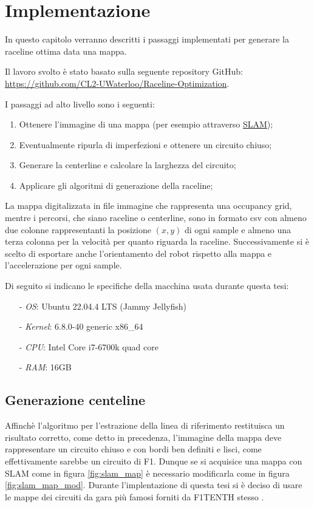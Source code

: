 
\chapter{Implementazione}
\label{chap:impl}
In questo capitolo verranno descritti i passaggi implementati per generare la raceline ottima data una
mappa.

Il lavoro svolto è stato basato sulla seguente repository GitHub:
\url{https://github.com/CL2-UWaterloo/Raceline-Optimization}.

\bigskip
\noindent I passaggi ad alto livello sono i seguenti:
\begin{enumerate}
	\item Ottenere l'immagine di una mappa (per esempio attraverso \hyperref[par:slam]{SLAM});
	\item Eventualmente ripurla di imperfezioni e ottenere un circuito chiuso; 
	\item Generare la centerline e calcolare la larghezza del circuito;
	\item Applicare gli algoritmi di generazione della raceline;
\end{enumerate}

La mappa digitalizzata in file immagine che rappresenta una occupancy grid, mentre
i percorsi, che siano raceline o centerline, sono in formato csv con almeno due colonne rappresentanti la
posizione $(x,y)$ di ogni sample e almeno una terza colonna per la velocità per quanto riguarda la
raceline. Successivamente si è scelto di esportare anche l'orientamento del robot rispetto alla mappa e
l'accelerazione per ogni sample.

\bigskip
\noindent Di seguito si indicano le specifiche della macchina usata durante questa tesi:
\begin{itemize}
	\item[-] \textit{OS}: Ubuntu 22.04.4 LTS (Jammy Jellyfish)
	\item[-] \textit{Kernel}: 6.8.0-40 generic x86\_64
	\item[-] \textit{CPU}: Intel Core i7-6700k quad core
	\item[-] \textit{RAM}: 16GB
\end{itemize}

\section{Generazione centeline}
Affinchè l'algoritmo per l'estrazione della linea di riferimento restituisca un risultato corretto, come
detto in precedenza, l'immagine della mappa deve rappresentare un circuito chiuso e con bordi ben
definiti e lisci, come effettivamente sarebbe un circuito di F1.
Dunque se si acquisice una mappa con SLAM come in figura \ref{fig:slam_map} è necessario modificarla come
in figura \ref{fig:slam_map_mod}. Durante l'implentazione di questa tesi si è deciso di usare le mappe
dei circuiti da gara più famosi forniti da F1TENTH stesso \cite{f1tenth-gitmaps}.

